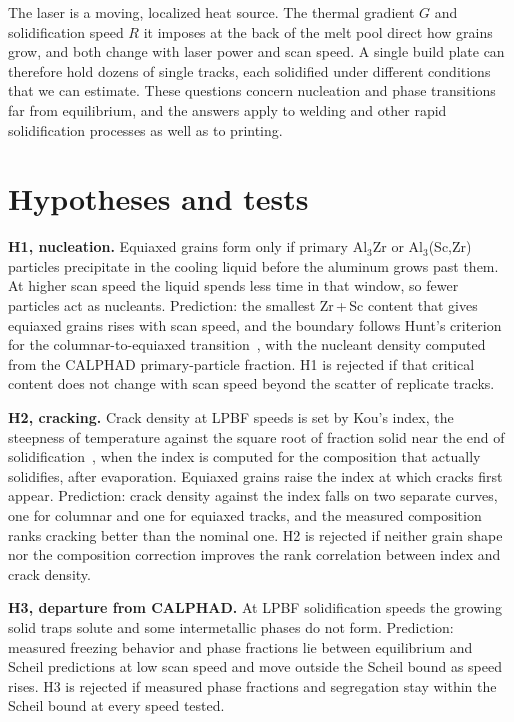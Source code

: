 \documentclass[11pt,letterpaper]{article}
\begin{document}
The laser is a moving, localized heat source. The thermal gradient $G$ and
solidification speed $R$ it imposes at the back of the melt pool direct how
grains grow, and both change with laser power and scan speed. A single build
plate can therefore hold dozens of single tracks, each solidified under
different conditions that we can estimate. These questions concern nucleation and phase
transitions far from equilibrium, and the answers apply to welding and other
rapid solidification processes as well as to printing.

\section{Hypotheses and tests}

\textbf{H1, nucleation.} Equiaxed grains form only if primary
Al$_3$Zr or Al$_3$(Sc,Zr) particles precipitate in the cooling liquid before
the aluminum grows past them. At higher scan speed the liquid spends less
time in that window, so fewer particles act as nucleants. Prediction: the
smallest Zr\,+\,Sc content that gives equiaxed grains rises with scan speed,
and the boundary follows Hunt's criterion for the columnar-to-equiaxed
transition~\cite{hunt1984}, with the nucleant density computed from the
CALPHAD primary-particle fraction. H1 is rejected if that critical content
does not change with scan speed beyond the scatter of replicate tracks.

\textbf{H2, cracking.} Crack density at LPBF speeds is set by Kou's index,
the steepness of temperature against the square root of fraction solid near
the end of solidification~\cite{kou2015}, when the index is computed for the
composition that actually solidifies, after evaporation. Equiaxed grains raise
the index at which cracks first appear. Prediction: crack density against the
index falls on two separate curves, one for columnar and one for equiaxed
tracks, and the measured composition ranks cracking better than the nominal
one. H2 is rejected if neither grain shape nor the composition correction
improves the rank correlation between index and crack density.

\textbf{H3, departure from CALPHAD.} At LPBF solidification speeds the
growing solid traps solute and some intermetallic phases do not form.
Prediction: measured freezing behavior and phase fractions lie between
equilibrium and Scheil predictions at low scan speed and move outside the
Scheil bound as speed rises. H3 is rejected if measured phase fractions and
segregation stay within the Scheil bound at every speed tested.
\end{document}
